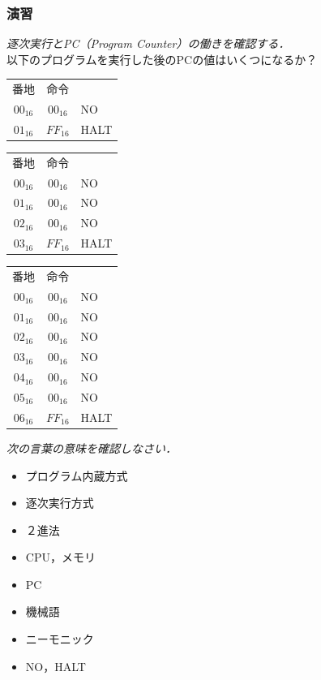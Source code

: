 \documentclass[handout]{beamer}        %
\begin{document}
\begin{frame}
  \frametitle{演習}
  \emph{逐次実行とPC（Program Counter）の働きを確認する．}\\
  以下のプログラムを実行した後のPCの値はいくつになるか？\\
  \begin{multicols}{3}
  {\ttfamily\small\begin{center}
    \begin{tabular}{c|c|l}
      \multicolumn{1}{c}{番地} & \multicolumn{1}{c}{命令} &  \\
      \cline{2-2}
      $00_{16}$ & $00_{16}$ & NO \\
      $01_{16}$ & $FF_{16}$ & HALT \\
      \cline{2-2}
    \end{tabular}
    \columnbreak
    \begin{tabular}{c|c|l}
      \multicolumn{1}{c}{番地} & \multicolumn{1}{c}{命令} &  \\
      \cline{2-2}
      $00_{16}$ & $00_{16}$ & NO \\
      $01_{16}$ & $00_{16}$ & NO \\
      $02_{16}$ & $00_{16}$ & NO \\
      $03_{16}$ & $FF_{16}$ & HALT \\
      \cline{2-2}
    \end{tabular}
    \begin{tabular}{c|c|l}
      \multicolumn{1}{c}{番地} & \multicolumn{1}{c}{命令} &  \\
      \cline{2-2}
      $00_{16}$ & $00_{16}$ & NO \\
      $01_{16}$ & $00_{16}$ & NO \\
      $02_{16}$ & $00_{16}$ & NO \\
      $03_{16}$ & $00_{16}$ & NO \\
      $04_{16}$ & $00_{16}$ & NO \\
      $05_{16}$ & $00_{16}$ & NO \\
      $06_{16}$ & $FF_{16}$ & HALT \\
      \cline{2-2}
    \end{tabular}
  \end{center}}
  \end{multicols}
  \vfill
  \emph{次の言葉の意味を確認しなさい．}
  \begin{multicols}{2}
  \begin{itemize}
  \item プログラム内蔵方式
  \item 逐次実行方式
  \item ２進法
  \item CPU，メモリ
  \item PC
  \item 機械語
  \item ニーモニック
  \item NO，HALT
  \end{itemize}
  \end{multicols}
  \vfill
\end{frame}

\end{document}
